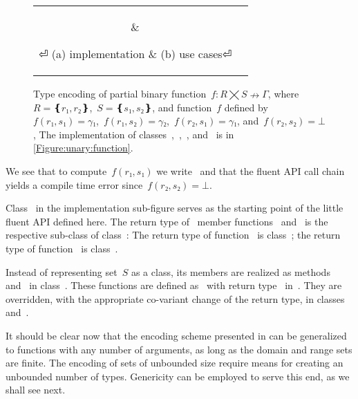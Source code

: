 \begin{figure}[hbt]
  \caption{\label{Figure:simple-binary}%
  Type encoding of partial binary function~$f: R⨉S↛Γ$,
  where~$R=❴r₁,r₂❵$,~$S=❴s₁,s₂❵$, and function~$f$
  defined by~$f(r₁,s₁)=γ₁$,~$f(r₁,s₂)=γ₂$,~$f(r₂,s₁)=γ₁$, and~$f(r₂, s₂)=⊥$,
  The implementation of classes~,~,~, and~ is in \cref{Figure:unary:function}.}
  \begin{tabular}{cc}
   \hspace{-2.5ex}
   \parbox[c]{0.57\linewidth}{%
   }
   &
   \hspace{-2.5ex}
   \parbox[c]{0.48\linewidth}{%
   }
⏎
   \hspace{-7ex}(a) implementation & \hspace{-5ex}(b) use cases⏎
  \end{tabular}
\end{figure}

We see that to compute~$f(r₁,s₁)$ we write~
  and that the fluent API call chain~ yields
  a compile time error since~$f(r₂, s₂)=⊥$.

Class~ in the implementation sub-figure serves as
  the starting point of the little fluent API defined here.
The return type of~ member functions~ and~
  is the respective sub-class of class~:
The return type of function~ is class~;
  the return type of function~ is class~.

Instead of representing set~$S$ as a class,
  its members are realized as methods~ and~ in class~.
These functions are defined as~ with return type~
  in~.
They are overridden, with the appropriate co-variant change of the return type,
  in classes~ and~.

It should be clear now that the encoding scheme presented 
  in  can be generalized to functions
  with any number of arguments, as long as the domain and range sets are finite.
The encoding of sets of unbounded size require means for creating an unbounded
 number of types.
Genericity can be employed to serve this end, as we shall see next. 

